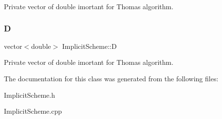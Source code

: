 Private vector of double imortant for Thomas algorithm. \mbox{\label{class_implicit_scheme_a30dad74ec599966b5ba7965f382d28cb}} 
\subsubsection{\texorpdfstring{D}{D}}
{\footnotesize\ttfamily vector$<$double$>$ Implicit\+Scheme\+::D\hspace{0.3cm}{\ttfamily [private]}}

Private vector of double imortant for Thomas algorithm. 

The documentation for this class was generated from the following files\+:\begin{DoxyCompactItemize}
\item 
Implicit\+Scheme.\+h\item 
Implicit\+Scheme.\+cpp\end{DoxyCompactItemize}
